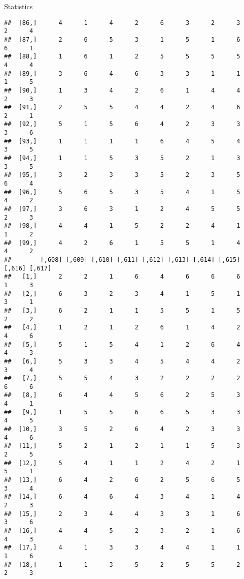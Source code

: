 \documentclass[
  ignorenonframetext,
]{beamer}
\begin{document}
\begin{frame}[fragile]{Statistics}
\begin{verbatim}
##  [86,]      4      1      4      2      6      3      2      3      2      4
##  [87,]      2      6      5      3      1      5      1      6      6      1
##  [88,]      1      6      1      2      5      5      5      5      4      4
##  [89,]      3      6      4      6      3      3      1      1      1      5
##  [90,]      1      3      4      2      6      1      4      4      2      3
##  [91,]      2      5      5      4      4      2      4      6      2      1
##  [92,]      5      1      5      6      4      2      3      3      3      6
##  [93,]      1      1      1      1      6      4      5      4      3      5
##  [94,]      1      1      5      3      5      2      1      3      3      5
##  [95,]      3      2      3      3      5      2      3      5      6      4
##  [96,]      5      6      5      3      5      4      1      5      4      2
##  [97,]      3      6      3      1      2      4      5      5      2      3
##  [98,]      4      4      1      5      2      2      4      1      1      2
##  [99,]      4      2      6      1      5      5      1      4      4      2
##        [,608] [,609] [,610] [,611] [,612] [,613] [,614] [,615] [,616] [,617]
##   [1,]      2      2      1      6      4      6      6      6      1      3
##   [2,]      6      3      2      3      4      1      5      1      3      1
##   [3,]      6      2      1      1      5      5      1      5      2      2
##   [4,]      1      2      1      2      6      1      4      2      4      6
##   [5,]      5      1      5      4      1      2      6      4      4      3
##   [6,]      5      3      3      4      5      4      4      2      3      4
##   [7,]      5      5      4      3      2      2      2      2      6      6
##   [8,]      6      4      4      5      6      2      5      3      4      1
##   [9,]      1      5      5      6      6      5      3      3      4      5
##  [10,]      3      5      2      6      4      2      3      3      4      6
##  [11,]      5      2      1      2      1      1      5      3      2      5
##  [12,]      5      4      1      1      2      4      2      1      5      1
##  [13,]      6      4      2      6      2      5      6      5      3      4
##  [14,]      6      4      6      4      3      4      1      4      2      3
##  [15,]      2      3      4      4      3      3      1      6      3      6
##  [16,]      4      4      5      2      3      2      1      6      4      3
##  [17,]      4      1      3      3      4      4      1      1      1      6
##  [18,]      1      1      3      5      2      5      5      2      2      3

\end{verbatim}
\end{frame}
\end{document}
